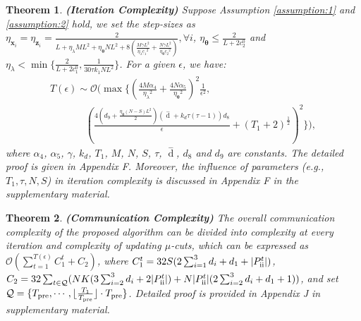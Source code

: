 \documentclass[letterpaper]{article} %
\newtheorem{theorem}{Theorem}
\begin{document}
\begin{theorem}
\label{theorem 2}
{\textbf{(Iteration Complexity)}} Suppose Assumption \ref{assumption:1} and \ref{assumption:2} hold, we set the step-sizes as
${\eta _{\boldsymbol{x}_i}}\!=\! {\eta _{\boldsymbol{z}_i}} \! =\! \frac{2}{{L + {{\eta _{\lambda}}}M{L^2} + {{\eta _{\boldsymbol{\theta }}}}N{L^2} + 8(\frac{{M\gamma {L^2}}}{{{{\eta _{\lambda}}}{\underline{c}_1}^2}} + \frac{{N\gamma {L^2}}}{{{{\eta _{\boldsymbol{\theta }}}}{\underline{c}_2}^2}})}},\forall i$, $ {\eta _{\boldsymbol{\theta }}} \le \frac{2}{{L + 2c_2^0}} $ and   ${{\eta _{\lambda}}} \!<\! \min \{\frac{ 2}{{L + 2c_1^0}}  ,\frac{1}{{30\tau{k_1}N{L^2}}}\} $. For a given $\epsilon $, we have:
\begin{equation}
\begin{array}{l}
\!T( \epsilon ) \! \sim  \! \mathcal{O}(\max  \{ {(\frac{{4M\alpha_4}}{{{{\eta _{\lambda}}}^2}}\! +\! \frac{{4N\alpha_5}}{{{{\eta _{\boldsymbol{\theta }}}}^2}})^2}\frac{1}{{{\epsilon ^2}}}, \\

\qquad \quad \; \;  {(\frac{{4{{{(d_9 + \frac{{{{\eta _{\boldsymbol{\theta }}}}(N  \!-\!  S){{L}^2}}}{2})}}} (\mathop d\limits^ -  +  k_d\tau(\tau  -  1))  {d_8}}}{{{\epsilon}}} \!+\! (T_1 \!+\! 2)^{\frac{1}{2}})^2}\}),
\end{array}
\end{equation}
where ${\alpha_4}$, ${\alpha_5}$, $\gamma$,  $k_d$, $T_1$, $M$, $N$, $S$, $\tau$, $\mathop d\limits^ -  $, ${d_8}$ and ${d_9}$ are constants. The detailed proof is given in Appendix F.  Moreover, the influence of parameters (e.g., $T_1, \tau, N, S$) in iteration complexity is discussed in Appendix F in the supplementary material.
\end{theorem}

\begin{theorem}
\label{theorem: communication complexity}
{\textbf{(Communication Complexity)}} The overall communication complexity of the proposed algorithm can be divided into complexity at every iteration and complexity of updating $\mu$-cuts, which can be expressed as $\mathcal{O}( \sum_{t=1}^{T( \epsilon )}{C_1^t} + C_2)$, where $C_1^t=32S(2\sum_{i=1}^3{d_i}+d_1 +|P_{{\rm{\uppercase\expandafter{\romannumeral2}}}}^{t}| )$, $C_2=32\sum_{t\in \mathcal{Q}} (NK(3\sum_{i=2}^3d_i+2|P_{{\rm{\uppercase\expandafter{\romannumeral2}}}}^{t}|) + N|P_{{\rm{\uppercase\expandafter{\romannumeral2}}}}^{t}|(2\sum_{i=2}^3d_i+d_1+1)  ) $, and set $\mathcal{Q}=\{ T_{{\rm{pre}}}, \cdots, \lfloor \frac{T_1}{T_{{\rm{pre}}}} \rfloor \cdot T_{{\rm{pre}}} \}$. Detailed proof is provided in Appendix J in supplementary material.

\end{theorem}
\end{document}
